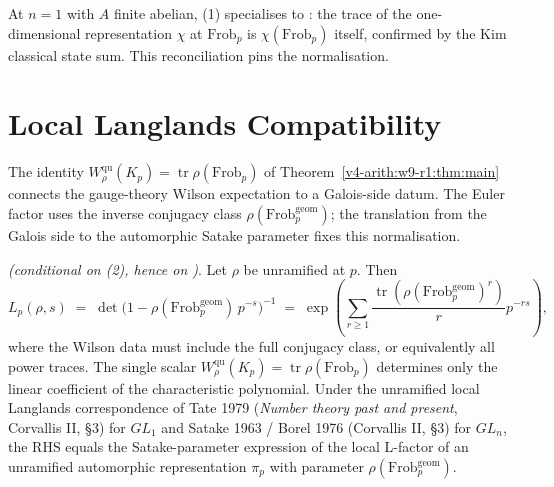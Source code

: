 \begin{remark}
\label{v4-arith:w9-r1:rem:abelian-check}
At \(n=1\) with \(A\) finite abelian,
(1) specialises to
: the trace of the
one-dimensional representation \(\chi\) at \(\mathrm{Frob}_{p}\) is
\(\chi(\mathrm{Frob}_{p})\) itself, confirmed by the Kim classical
state sum. This reconciliation pins the normalisation.
\end{remark}

\section{Local Langlands Compatibility}
\label{v4-arith:w9-r1:sec:langlands}

The identity \(W^{\mathrm{qu}}_{\rho}(K_{p}) = \operatorname{tr}\rho(\mathrm{Frob}_{p})\)
of Theorem~\ref{v4-arith:w9-r1:thm:main} connects the gauge-theory Wilson
expectation to a Galois-side datum. The Euler factor uses the inverse
conjugacy class \(\rho(\mathrm{Frob}_{p}^{\mathrm{geom}})\); the
translation from the Galois side to the automorphic Satake parameter
fixes this normalisation.

\begin{theorem}
\label{v4-arith:w9-r1:thm:local-L-factor}
\ClaimStatusProvedHereConditional \emph{(conditional on
(2), hence on
)}. Let \(\rho\) be unramified at \(p\).
Then
\begin{equation}
\label{v4-arith:w9-r1:eq:local-L-factor}
L_{p}(\rho,s)
\;=\;\det\!\bigl(1-\rho(\mathrm{Frob}_{p}^{\mathrm{geom}})\,p^{-s}\bigr)^{-1}
\;=\;\exp\!\left(\sum_{r\geq1}
\frac{\operatorname{tr}(\rho(\mathrm{Frob}_{p}^{\mathrm{geom}})^{r})}{r}p^{-rs}\right),
\end{equation}
where the Wilson data must include the full conjugacy class, or
equivalently all power traces. The single scalar
\(W^{\mathrm{qu}}_{\rho}(K_p)=\operatorname{tr}\rho(\mathrm{Frob}_{p})\)
determines only the linear coefficient of the characteristic
polynomial. Under the unramified local Langlands
correspondence of Tate 1979 (\emph{Number theory past and present},
Corvallis II, \S3) for \(GL_{1}\) and Satake 1963 / Borel 1976
(Corvallis II, \S3) for \(GL_{n}\), the RHS equals the Satake-parameter
expression of the local L-factor of an unramified automorphic
representation \(\pi_{p}\) with parameter
\(\rho(\mathrm{Frob}_{p}^{\mathrm{geom}})\).
\end{theorem}

